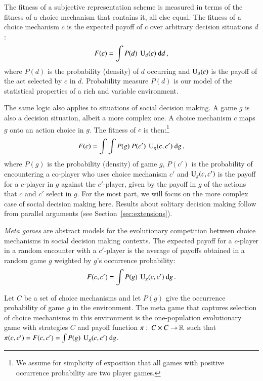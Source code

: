 \documentclass[fleqn,reqno,11pt]{article}
\begin{document}
The fitness of a subjective representation scheme is measured in terms of the fitness of a
choice mechanism that contains it, all else equal. The fitness of a choice mechanism $c$ is the
expected payoff of $c$ over arbitrary decision situations $d$:
\begin{align}
  \label{eq:FittnessChoiceMechSolitary}
  F(c) = \int P(d) \  \operatorname{U}_d(c) \text{ d} d \,,
\end{align}
where $P(d)$ is the probability (density) of $d$ occurring and $\operatorname{U}_d(c)$ is the payoff of
the act selected by $c$ in $d$. Probability measure $P(d)$ is our model of the statistical
properties of a rich and variable environment.

The same logic also applies to situations of social decision making. A game $g$ is also a
decision situation, albeit a more complex one. A choice mechanism $c$ maps $g$ onto an action
choice in $g$. The fitness of $c$ is then:\footnote{We assume for simplicity of exposition that
  all games with positive occurrence probability are two player games.}
\begin{align}
  \label{eq:FittnessChoiceMechGame}
  F(c) = \int \int P(g) \  P(c') \  \operatorname{U}_g(c,c') \text{ d} g \,,
\end{align}
where $P(g)$ is the probability (density) of game $g$, $P(c')$ is the probability of
encountering a co-player who uses choice mechanism $c'$ and $\operatorname{U}_g(c,c')$ is the payoff for
a $c$-player in $g$ against the $c'$-player, given by the payoff in $g$ of the actions that $c$
and $c'$ select in $g$. For the most part, we will focus on the more complex case of social
decision making here. Results about solitary decision making follow from parallel arguments
(see Section~\ref{sec:extensions}).

\emph{Meta games} are abstract models for the evolutionary competition between choice
mechanisms in social decision making contexts. The expected payoff for a $c$-player in a random
encounter with a $c'$-player is the average of payoffs obtained in a random game $g$ weighted
by $g$'s occurrence probability:
\begin{align}
  F(c, c') = \int P(g) \  \operatorname{U}_g(c,c') \text{ d} g \,.
\end{align}

\begin{definition}
  \label{def:MetaGame}
  Let $C$ be a set of choice mechanisms and let $P(g)$ give the occurrence probability of game
  $g$ in the environment. The meta game that captures selection of choice mechanisms in this
  environment is the one-population evolutionary game with strategies $C$ and payoff function
  $\pi \thinspace \colon \thinspace C \times C \rightarrow \mathbb{R}$ such that
  $\pi(c,c') = F(c,c') = \int P(g) \  \operatorname{U}_g(c,c') \text{ d} g$.
\end{definition}
\end{document}
